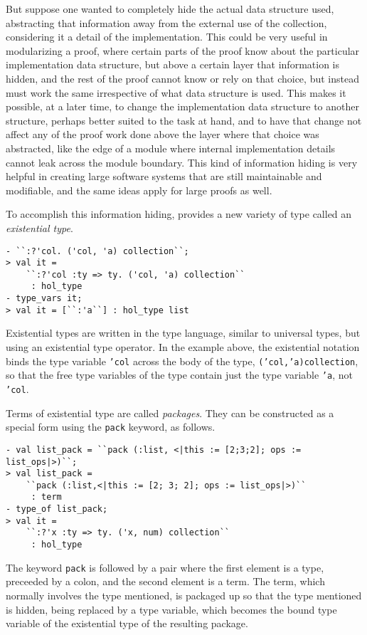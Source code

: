 But suppose one wanted to completely hide the actual data structure used, abstracting
that information away from the external use of the collection, considering it a detail
of the implementation.
This could be very useful in modularizing a proof, where certain parts of the proof
know about the particular implementation data structure, but above a certain layer
that information is hidden, and the rest of the proof cannot know or rely on that
choice, but instead must work the same irrespective of what data structure is used.
This makes it possible, at a later time, to change the implementation data structure
to another structure, perhaps better suited to the task at hand, and to have that change
not affect any of the proof work done above the layer where that choice was abstracted,
like the edge of a module where internal implementation details cannot leak across
the module boundary.  This kind of information hiding is very helpful in creating large
software systems that are still maintainable and modifiable, and the same ideas apply
for large proofs as well.

To accomplish this information hiding, \HOLW{} provides a new variety of type called
an {\it existential type}.
\begin{session}
\begin{verbatim}
- ``:?'col. ('col, 'a) collection``;
> val it =
    ``:?'col :ty => ty. ('col, 'a) collection``
     : hol_type
- type_vars it;
> val it = [``:'a``] : hol_type list
\end{verbatim}
\end{session}
Existential types are written in the type language, similar to universal types, but
using an existential type operator. 
In the example above, the existential notation binds the type variable
\texttt{'col} across the body of the type,
\texttt{('col,'a)collection},
so that the free type variables of the type contain just the type variable \texttt{'a},
not \texttt{'col}.

Terms of existential type are called {\it packages}.  They can be constructed as a
special form using the \texttt{pack} keyword, as follows.
\begin{session}
\begin{verbatim}
- val list_pack = ``pack (:list, <|this := [2;3;2]; ops := list_ops|>)``;
> val list_pack =
    ``pack (:list,<|this := [2; 3; 2]; ops := list_ops|>)``
     : term
- type_of list_pack;
> val it =
    ``:?'x :ty => ty. ('x, num) collection``
     : hol_type
\end{verbatim}
\end{session}
The keyword \texttt{pack} is followed by a pair where the first element is a type,
preceeded by a colon, and the second element is a term.  The term, which normally
involves the type mentioned, is packaged up so that the type mentioned is hidden,
being replaced by a type variable, which becomes the bound type variable of the
existential type of the resulting package.

